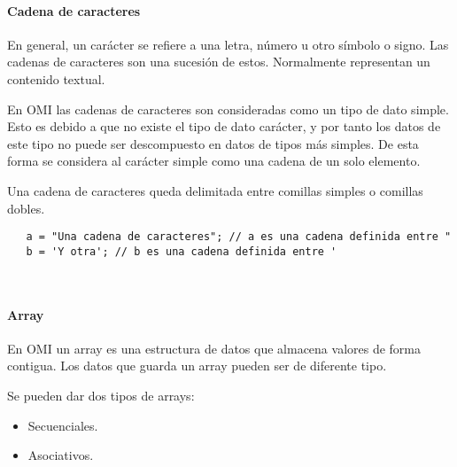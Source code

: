 \paragraph{Cadena de caracteres}\label{sec:type_string}
En general, un carácter se refiere a una letra, número u otro símbolo o signo. Las cadenas de caracteres son una sucesión de estos. Normalmente representan un contenido textual. 

En OMI las cadenas de caracteres son consideradas como un tipo de dato simple. Esto es debido a que no existe el tipo de dato carácter, y por tanto los datos de este tipo no puede ser 
descompuesto en datos de tipos más simples. De esta forma se considera al carácter simple como una cadena de un solo elemento.

Una cadena de caracteres queda delimitada entre comillas simples o comillas dobles. \\

\begin{lstlisting}
   a = "Una cadena de caracteres"; // a es una cadena definida entre "
   b = 'Y otra'; // b es una cadena definida entre '
\end{lstlisting}
\hfill\\


\paragraph{Array}\label{sec:type_array}

En OMI un array es una estructura de datos que almacena valores de forma contigua. Los datos que guarda un array pueden ser de diferente tipo. 

Se pueden dar dos tipos de arrays:

\begin{itemize}
\item Secuenciales.
\item Asociativos.
\end{itemize}

